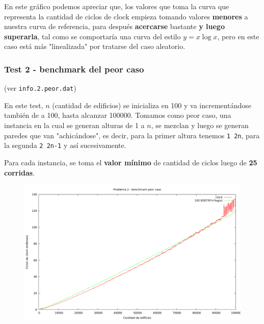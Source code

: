 \vspace*{0.5cm}

En este gráfico podemos apreciar que, los valores que toma la curva que representa la cantidad de ciclos 
de clock empieza tomando valores \textbf{menores} a nuestra curva de referencia, para después \textbf{acercarse} bastante \textbf{y 
luego superarla}, tal como se comportaría una curva del estilo $y = x \log x$, pero en este caso está más 
"linealizada" por tratarse del caso aleatorio.

\newpage


\subsubsection{Test 2 - benchmark del peor caso}

(ver \verb|info.2.peor.dat|) \medskip

En este test, $n$ (cantidad de edificios) se inicializa en 100 y va incrementándose también de a 100, 
hasta alcanzar 100000. Tomamos como peor caso, una instancia en la cual se generan alturas de 1 a $n$, 
se mezclan y luego se generan paredes que van "achicándose", es decir, para la primer altura tenemos 
\verb|1 2n|, para la segunda \verb|2 2n-1| y así sucesivamente.
 
Para cada instancia, se toma el \textbf{valor mínimo} de cantidad de ciclos luego de \textbf{25 corridas}.

\vspace*{0.5cm}

\begin{figure}[h]
  \begin{center}
    \includegraphics[scale=0.35]{imagenes/grafico-2-peor.png}
  \end{center}
\end{figure}

